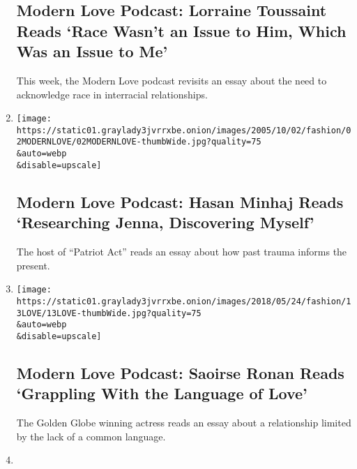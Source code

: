 \begin{enumerate}
  \hypertarget{modern-love-podcast-lorraine-toussaint-reads-race-wasnt-an-issue-to-him-which-was-an-issue-to-me}{%
  \subsection{Modern Love Podcast: Lorraine Toussaint Reads `Race Wasn't
  an Issue to Him, Which Was an Issue to
  Me'}\label{modern-love-podcast-lorraine-toussaint-reads-race-wasnt-an-issue-to-him-which-was-an-issue-to-me}}

  This week, the Modern Love podcast revisits an essay about the need to
  acknowledge race in interracial relationships.
\item
  \href{/2020/06/03/style/modern-love-podcast-hasan-minhaj.html}{}

  \texttt{[image: https://static01.graylady3jvrrxbe.onion/images/2005/10/02/fashion/02MODERNLOVE/02MODERNLOVE-thumbWide.jpg?quality=75\\\&auto=webp\\\&disable=upscale]}

  \hypertarget{modern-love-podcast-hasan-minhaj-reads-researching-jenna-discovering-myself}{%
  \subsection{Modern Love Podcast: Hasan Minhaj Reads `Researching
  Jenna, Discovering
  Myself'}\label{modern-love-podcast-hasan-minhaj-reads-researching-jenna-discovering-myself}}

  The host of ``Patriot Act'' reads an essay about how past trauma
  informs the present.
\item
  \href{/2020/05/27/style/modern-love-podcast-saoirse-ronan.html}{}

  \texttt{[image: https://static01.graylady3jvrrxbe.onion/images/2018/05/24/fashion/13LOVE/13LOVE-thumbWide.jpg?quality=75\\\&auto=webp\\\&disable=upscale]}

  \hypertarget{modern-love-podcast-saoirse-ronan-reads-grappling-with-the-language-of-love}{%
  \subsection{Modern Love Podcast: Saoirse Ronan Reads `Grappling With
  the Language of
  Love'}\label{modern-love-podcast-saoirse-ronan-reads-grappling-with-the-language-of-love}}

  The Golden Globe winning actress reads an essay about a relationship
  limited by the lack of a common language.
\item
  \href{/2020/05/20/style/modern-love-podcast-jameela-jamil.html}{}


\end{enumerate}
